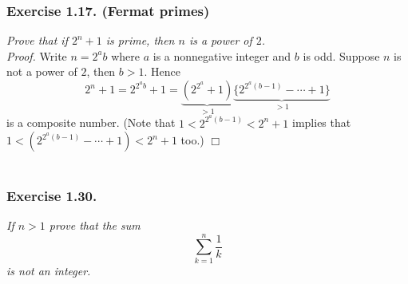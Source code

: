 \documentclass{article}
\begin{document}



\subsubsection*{Exercise 1.17. (Fermat primes)}
\emph{Prove that if $2^n+1$ is prime, then $n$ is a power of $2$.} \\



\emph{Proof.}
  Write $n = 2^a b$ where $a$ is a nonnegative integer and $b$ is odd.
  Suppose $n$ is not a power of $2$, then $b > 1$.
  Hence
  \[
    2^n + 1
    = 2^{2^a b} + 1
    = \underbrace{(2^{2^a} + 1)}_{> 1}
        \underbrace{\{2^{2^a(b-1)} - \cdots + 1\}}_{> 1}
  \]
  is a composite number.
  (Note that $1 < 2^{2^a(b-1)} < 2^n + 1$
  implies that $1 < (2^{2^a(b-1)} - \cdots + 1) < 2^n+1$ too.)
$\Box$ \\\\






\subsubsection*{Exercise 1.30.}
\emph{If $n > 1$ prove that the sum
\[
  \sum_{k=1}^{n} \frac{1}{k}
\]
is not an integer.} \\
\end{document}
